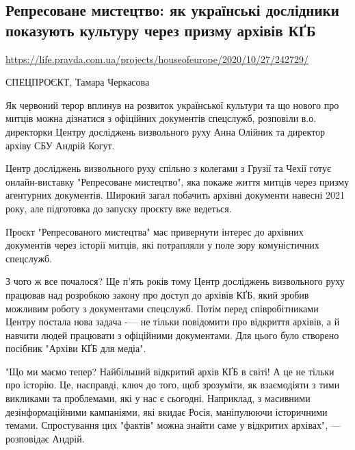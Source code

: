  


\subsection{Репресоване мистецтво: як українські дослідники показують культуру
через призму архівів КҐБ}

{\small
\vspace{0.5cm}
\url{https://life.pravda.com.ua/projects/houseofeurope/2020/10/27/242729/}
\vspace{0.5cm}
}

СПЕЦПРОЄКТ, Тамара Черкасова

Як червоний терор вплинув на розвиток української культури та що нового про
митців можна дізнатися з офіційних документів спецслужб, розповіли в.о.
директорки Центру досліджень визвольного руху Анна Олійник та директор архіву
СБУ Андрій Когут.

Центр досліджень визвольного руху спільно з колегами з Грузії та Чехії готує
онлайн-виставку "Репресоване мистецтво", яка покаже життя митців через призму
агентурних документів. Широкий загал побачить архівні документи навесні 2021
року, але підготовка до запуску проєкту вже ведеться.

Проєкт "Репресованого мистецтва" має привернути інтерес до архівних документів
через історії митців, які потрапляли у поле зору комуністичних спецслужб. 

З чого ж все почалося? Ще п'ять років тому Центр досліджень визвольного руху
працював над розробкою закону про доступ до архівів КҐБ, який зробив можливим
роботу з документами спецслужб. Потім перед співробітниками Центру постала нова
задача -— не тільки повідомити про відкриття архівів, а й навчити людей
працювати з офіційними документами. Для цього було створено посібник "Архіви
КҐБ для медіа".

"Що ми маємо тепер? Найбільший відкритий архів КҐБ в світі! А це не тільки про
історію. Це, насправді, ключ до того, щоб зрозуміти, як взаємодіяти з тими
викликами та проблемами, які у нас є сьогодні. Наприклад, з масивними
дезінформаційними кампаніями, які вкидає Росія, маніпулюючи історичними темами.
Спростування цих "фактів" можна знайти саме у відкритих архівах", — розповідає
Андрій.

